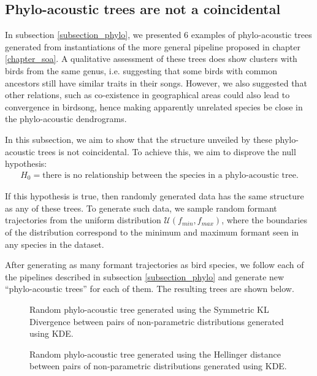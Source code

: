 \documentclass[../main.tex]{subfiles}
\begin{document}
\subsection{Phylo-acoustic trees are not a coincidental} \label{subsection_null}
In subsection \ref{subsection_phylo}, we presented 6 examples of phylo-acoustic trees generated from instantiations of the more general pipeline proposed in chapter \ref{chapter_soa}. A qualitative assessment of these trees does show clusters with birds from the same genus, i.e. suggesting that some birds with common ancestors still have similar traits in their songs. However, we also suggested that other relations, such as co-existence in geographical areas could also lead to convergence in birdsong, hence making apparently unrelated species be close in the phylo-acoustic dendrograms.
\par In this subsection, we aim to show that the structure unveiled by these phylo-acoustic trees is not coincidental. To achieve this, we aim to disprove the null hypothesis:
\begin{align*}
H_0 = \text{there is no relationship between the species in a phylo-acoustic tree.}
\end{align*}
\par If this hypothesis is true, then randomly generated data has the same structure as any of these trees. To generate such data, we sample random formant trajectories from the uniform distribution $\mathcal{U}(f_{min}, f_{max})$, where the boundaries of the distribution correspond to the minimum and maximum formant seen in any species in the dataset. 
\par After generating as many formant trajectories as bird species, we follow each of the pipelines described in subsection \ref{subsection_phylo} and generate new ``phylo-acoustic trees'' for each of them. The resulting trees are shown below.
\begin{sidewaysfigure}[!ht]
\noindent{}
    \caption{Random phylo-acoustic tree generated using the Symmetric KL Divergence between pairs of non-parametric distributions generated using KDE.}
    \label{fig:rkdeskld}
\end{sidewaysfigure}


\begin{sidewaysfigure}[!ht]
\noindent{}
    \caption{Random phylo-acoustic tree generated using the Hellinger distance between pairs of non-parametric distributions generated using KDE.}
    \label{fig:rkdehellinger}
\end{sidewaysfigure}
\end{document}
